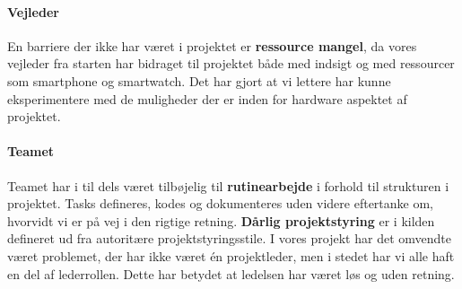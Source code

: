 \paragraph{Vejleder}
En barriere der ikke har været i projektet er \textbf{ressource mangel}, da vores vejleder fra starten har bidraget til projektet både med indsigt og med ressourcer som smartphone og smartwatch.
Det har gjort at vi lettere har kunne eksperimentere med de muligheder der er inden for hardware aspektet af projektet.

\paragraph{Teamet}
Teamet har i til dels været tilbøjelig til \textbf{rutinearbejde} i forhold til strukturen i projektet.
Tasks defineres, kodes og dokumenteres uden videre eftertanke om, hvorvidt vi er på vej i den rigtige retning.
\textbf{Dårlig projektstyring} er i kilden defineret ud fra autoritære projektstyringsstile.
I vores projekt har det omvendte været problemet, der har ikke været én projektleder, men i stedet har vi alle haft en del af lederrollen.
Dette har betydet at ledelsen har været løs og uden retning.